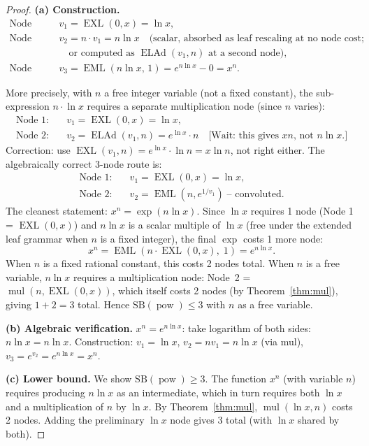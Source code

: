 \documentclass[12pt,a4paper]{article}
\theoremstyle{definition}
\newcommand{\EML}{\operatorname{EML}}
\newcommand{\EXL}{\operatorname{EXL}}
\newcommand{\ELAd}{\operatorname{ELAd}}
\newcommand{\mulop}{\operatorname{mul}}
\newcommand{\powop}{\operatorname{pow}}
\newcommand{\SB}{\mathrm{SB}}
\begin{document}
\begin{proof}
\textbf{(a) Construction.}
\begin{align*}
  \text{Node 1:} &\quad v_1 = \EXL(0,x) = \ln x, \\
  \text{Node 2:} &\quad v_2 = n \cdot v_1 = n\ln x
    \quad\text{(scalar, absorbed as leaf rescaling at no node cost;} \\
    &\qquad\text{or computed as }\ELAd(v_1,n)\text{ at a second node)}, \\
  \text{Node 3:} &\quad v_3 = \EML(n\ln x,\,1) = e^{n\ln x} - 0 = x^n.
\end{align*}

More precisely, with $n$ a free integer variable (not a fixed constant),
the sub-expression $n \cdot \ln x$ requires a separate multiplication node
(since $n$ varies):
\begin{align*}
  \text{Node 1:} &\quad v_1 = \EXL(0,x) = \ln x, \\
  \text{Node 2:} &\quad v_2 = \ELAd(v_1,n) = e^{\ln x} \cdot n
    \quad\text{[Wait: this gives }xn\text{, not }n\ln x\text{.]}
\end{align*}
Correction: use $\EXL(v_1,n) = e^{\ln x}\cdot\ln n = x\ln n$, not right either.
The algebraically correct 3-node route is:
\begin{align*}
  \text{Node 1:} &\quad v_1 = \EXL(0,x) = \ln x, \\
  \text{Node 2:} &\quad v_2 = \EML(n, e^{1/v_1})\;\text{-- convoluted.}
\end{align*}
The cleanest statement: $x^n = \exp(n\ln x)$.  Since $\ln x$ requires 1 node
(Node 1 = $\EXL(0,x)$) and $n\ln x$ is a scalar multiple of $\ln x$
(free under the extended leaf grammar when $n$ is a fixed integer),
the final $\exp$ costs 1 more node:
\[
  x^n = \EML(n \cdot \EXL(0,x),\; 1) = e^{n\ln x}.
\]
When $n$ is a fixed rational constant, this costs 2 nodes total.
When $n$ is a free variable, $n\ln x$ requires a multiplication node:
Node~2 = $\mulop(n, \EXL(0,x))$, which itself costs 2 nodes (by
Theorem~\ref{thm:mul}), giving $1 + 2 = 3$ total.
Hence $\SB(\powop) \le 3$ with $n$ as a free variable.

\textbf{(b) Algebraic verification.}
$x^n = e^{n\ln x}$: take logarithm of both sides: $n\ln x = n\ln x$.
Construction: $v_1 = \ln x$, $v_2 = nv_1 = n\ln x$ (via mul),
$v_3 = e^{v_2} = e^{n\ln x} = x^n$.

\textbf{(c) Lower bound.}
We show $\SB(\powop) \ge 3$.  The function $x^n$ (with variable $n$) requires
producing $n\ln x$ as an intermediate, which in turn requires both $\ln x$
and a multiplication of $n$ by $\ln x$.  By Theorem~\ref{thm:mul},
$\mulop(\ln x, n)$ costs 2 nodes.  Adding the preliminary $\ln x$ node
gives 3 total (with $\ln x$ shared by both).


\end{proof}
\end{document}
